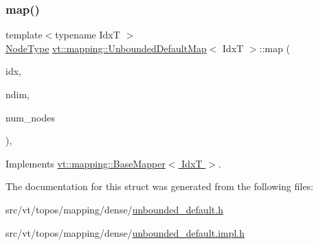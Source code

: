 \subsubsection{\texorpdfstring{map()}{map()}}
{\footnotesize\ttfamily template$<$typename IdxT $>$ \\
\hyperlink{namespacevt_a866da9d0efc19c0a1ce79e9e492f47e2}{Node\+Type} \hyperlink{structvt_1_1mapping_1_1_unbounded_default_map}{vt\+::mapping\+::\+Unbounded\+Default\+Map}$<$ IdxT $>$\+::map (\begin{DoxyParamCaption}\item[{IdxT $\ast$}]{idx,  }\item[{int}]{ndim,  }\item[{\hyperlink{namespacevt_a866da9d0efc19c0a1ce79e9e492f47e2}{Node\+Type}}]{num\+\_\+nodes }\end{DoxyParamCaption})\hspace{0.3cm}{\ttfamily [override]}, {\ttfamily [virtual]}}



Implements \hyperlink{structvt_1_1mapping_1_1_base_mapper_a940a3ea301c0f60b2b88218afbce5a4f}{vt\+::mapping\+::\+Base\+Mapper$<$ Idx\+T $>$}.



The documentation for this struct was generated from the following files\+:\begin{DoxyCompactItemize}
\item 
src/vt/topos/mapping/dense/\hyperlink{unbounded__default_8h}{unbounded\+\_\+default.\+h}\item 
src/vt/topos/mapping/dense/\hyperlink{unbounded__default_8impl_8h}{unbounded\+\_\+default.\+impl.\+h}\end{DoxyCompactItemize}
